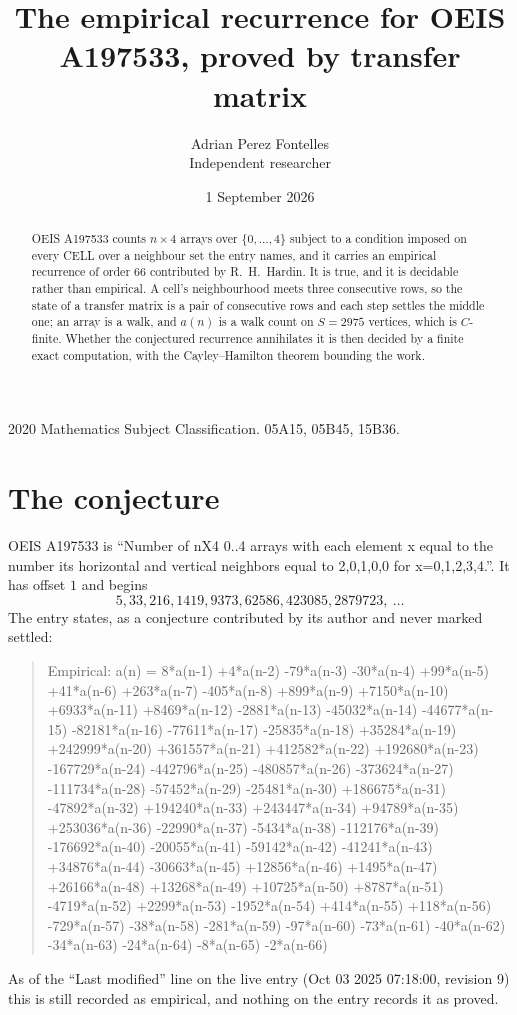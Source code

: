 \documentclass[11pt,a4paper]{article}
\title{The empirical recurrence for OEIS A197533, proved by transfer matrix}
\author{Adrian Perez Fontelles\\ \small Independent researcher}
\date{1 September 2026}
\theoremstyle{plain}
\theoremstyle{definition}
\begin{document}
\maketitle

\begin{abstract}
OEIS A197533 counts $n\times4$ arrays over $\{0,\dots,4\}$ subject to a condition imposed on
every CELL over a neighbour set the entry names, and it carries an empirical recurrence of
order $66$ contributed by R.~H.~Hardin. It is true, and it is decidable rather than
empirical. A cell's neighbourhood meets three consecutive rows, so the state of a transfer
matrix is a pair of consecutive rows and each step settles the middle one; an array is a
walk, and $a(n)$ is a walk count on $S=2975$ vertices, which is $C$-finite. Whether the
conjectured recurrence annihilates it is then decided by a finite exact computation, with the
Cayley--Hamilton theorem bounding the work.
\end{abstract}

\noindent\small 2020 Mathematics Subject Classification. 05A15, 05B45, 15B36.\normalsize

\section{The conjecture}

OEIS A197533 is ``Number of nX4 0..4 arrays with each element x equal to the number its horizontal and vertical neighbors equal to 2,0,1,0,0 for x=0,1,2,3,4.''. It has offset $1$ and begins
\[
5, 33, 216, 1419, 9373, 62586, 423085, 2879723,\ \dots
\]
The entry states, as a conjecture contributed by its author and never marked settled:
\begin{quote}
Empirical: a(n) = 8*a(n-1) +4*a(n-2) -79*a(n-3) -30*a(n-4) +99*a(n-5) +41*a(n-6) +263*a(n-7) -405*a(n-8) +899*a(n-9) +7150*a(n-10) +6933*a(n-11) +8469*a(n-12) -2881*a(n-13) -45032*a(n-14) -44677*a(n-15) -82181*a(n-16) -77611*a(n-17) -25835*a(n-18) +35284*a(n-19) +242999*a(n-20) +361557*a(n-21) +412582*a(n-22) +192680*a(n-23) -167729*a(n-24) -442796*a(n-25) -480857*a(n-26) -373624*a(n-27) -111734*a(n-28) -57452*a(n-29) -25481*a(n-30) +186675*a(n-31) -47892*a(n-32) +194240*a(n-33) +243447*a(n-34) +94789*a(n-35) +253036*a(n-36) -22990*a(n-37) -5434*a(n-38) -112176*a(n-39) -176692*a(n-40) -20055*a(n-41) -59142*a(n-42) -41241*a(n-43) +34876*a(n-44) -30663*a(n-45) +12856*a(n-46) +1495*a(n-47) +26166*a(n-48) +13268*a(n-49) +10725*a(n-50) +8787*a(n-51) -4719*a(n-52) +2299*a(n-53) -1952*a(n-54) +414*a(n-55) +118*a(n-56) -729*a(n-57) -38*a(n-58) -281*a(n-59) -97*a(n-60) -73*a(n-61) -40*a(n-62) -34*a(n-63) -24*a(n-64) -8*a(n-65) -2*a(n-66)
\end{quote}
As of the ``Last modified'' line on the live entry (Oct 03 2025 07:18:00, revision 9) this is still
recorded as empirical, and nothing on the entry records it as proved.
\end{document}
